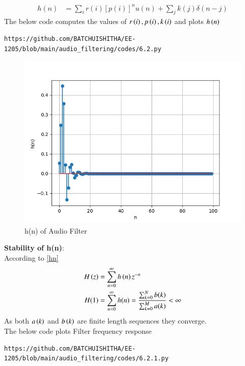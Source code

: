\documentclass[journal,12pt,twocolumn]{IEEEtran}
\theoremstyle{remark}
\begin{document}
\begin{enumerate}[label=\thesection.\arabic*]
\begin{align}
h(n) &= \sum_{i}r(i)[p(i)]^nu(n) + \sum_{j}k(j)\delta(n - j)
	\label{eq:6.2.4}
\end{align}
The below code computes the values of $r\left(i\right),p\left(i\right) , k\left(i\right)$ and plots $h\left(n\right)$
\begin{lstlisting}
https://github.com/BATCHUISHITHA/EE-1205/blob/main/audio_filtering/codes/6.2.py
\end{lstlisting}

\begin{figure}[ht]
\centering
\includegraphics[width=1\columnwidth]{figs/6.2.png}
\caption{h(n) of Audio Filter}
\label{fig:6.2}
\end{figure}
\textbf{Stability of h(n)}:\\
According to \eqref{hn}
\begin{align}
H\left(z\right) &= \sum_{n = 0}^{\infty} h\left(n\right)z^{-n}\\
H(1)&= \sum_{n = 0}^{\infty}h(n)  = \frac{\sum_{k = 0}^{N}b(k)}{\sum_{k = 0}^{M}a(k)}< \infty
\end{align}
As both $a\left(k\right)$ and $b\left(k\right)$ are finite length sequences they converge.\\
The below code plots Filter frequency response
\begin{lstlisting}
https://github.com/BATCHUISHITHA/EE-1205/blob/main/audio_filtering/codes/6.2.1.py
\end{lstlisting}
\begin{figure}[ht]
\centering

\end{figure}
\end{enumerate}
\end{document}
